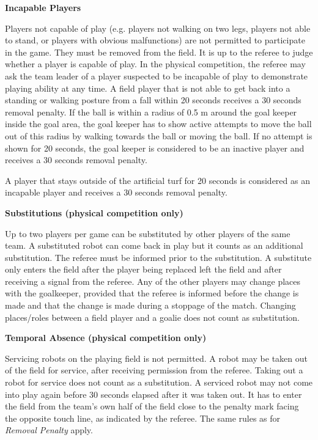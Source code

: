 \bigskip


{\bfseries Incapable Players}

Players not capable of play (e.g. players not walking on two legs,
players not able to stand, or players with obvious malfunctions)
are not permitted to participate in the game.
They must be removed from the field.
It is up to the referee to judge whether a player is capable of play.
In the physical competition, the referee may ask the team leader of a player suspected to be incapable of
play to demonstrate playing ability at any time.
A field player that is not able to get back into a standing or walking
posture from a fall within 20 seconds receives a 30
seconds removal penalty.
If the ball is within a radius of 0.5 m around the goal keeper inside the goal area,
the goal keeper has to show active attempts to move the ball out of this radius by walking towards the ball or moving the ball.
If no attempt is shown for 20 seconds, the goal keeper is considered to be an
inactive player and receives a 30 seconds removal penalty.

A player that stays outside of the artificial turf for 20 seconds is
  considered as an incapable player and receives a 30 seconds removal penalty.

\bigskip
 

\bigskip

{\bfseries Substitutions (physical competition only)}

Up to two players per game can be substituted by other players of the same team.
A substituted robot can come back in play but it counts as an additional substitution.
The referee must be informed prior to the substitution.
A substitute only enters the field after the player being replaced left the
field and after receiving a signal from the referee.
Any of the other players may change places with the goalkeeper,
provided that the referee is informed before the change is made and that the
change is made during a stoppage of the match.
Changing places/roles between a field player and a goalie does not count as
substitution.

\bigskip

{\bfseries Temporal Absence (physical competition only)}

Servicing robots on the playing field is not permitted.
A robot may be taken out of the field for service,
after receiving permission from the referee.
Taking out a robot for service does not count as a substitution.
A serviced robot may not come into play again before 30 seconds elapsed after it
was taken out.
It has to enter the field from the team's own half of the field close to the
penalty mark facing the opposite touch line, as indicated by the referee.
The same rules as for \textit{Removal Penalty} apply.

